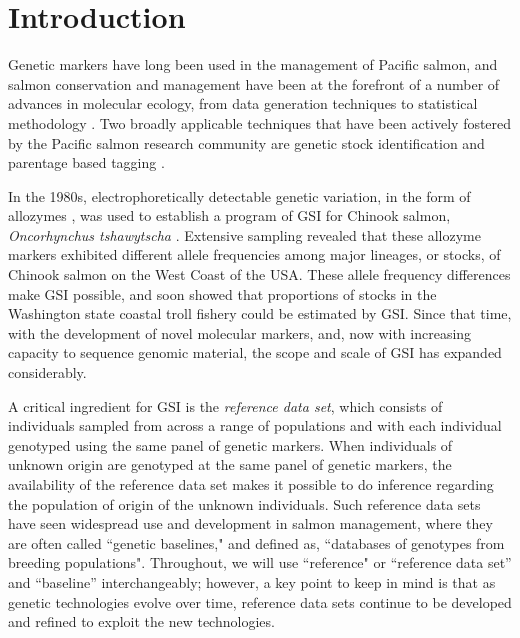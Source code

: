
\section*{Introduction}

Genetic markers have long been used in the
management of Pacific salmon, and salmon conservation and management have been
at the forefront of a number of advances in molecular ecology,
from data generation techniques \citep{clemento2011discovery,campbell2015genotyping,mckinney2017managing,baetscher2018microhaplotypes}
to statistical methodology
\citep{smouse1990genetic,anderson2002model,pella2006gibbs,anderson2010assessing}.
Two broadly applicable techniques that have been
actively fostered by the Pacific salmon research community are genetic
stock identification
\citep[GSI:~][]{milner1982genetic,beacham2004dna,seeb2007development}
and parentage based tagging
\citep[PBT:~][]{anderson2006power, garza2007large, abadia2013large, steele2013validation}.



 In the 1980s, electrophoretically
detectable genetic variation, in the form of allozymes
\citep{ayala1972allozymes,allendorf1981use}, was used to
establish a program of GSI for Chinook salmon,
{\em Oncorhynchus tshawytscha} \citep{milner1982genetic}.  Extensive sampling
revealed that these allozyme markers
exhibited different allele frequencies among major lineages, or stocks, of Chinook salmon on the West Coast of the USA.
These allele frequency differences make GSI possible, and
\citet{milner1985genetic} soon showed that proportions of stocks in
the Washington state coastal troll fishery could be estimated by GSI\@.
Since that time, with the development of novel molecular markers, and, now
with increasing capacity to sequence genomic material, the scope and scale of GSI
has expanded considerably.

A critical ingredient for GSI is the {\em reference data set}, which consists of individuals
sampled from across a range of populations and with each individual genotyped using the same
panel of genetic markers.  When individuals of unknown origin are genotyped
at the same panel of genetic markers, the availability of the reference data set
makes it possible to do inference regarding the population of origin of the
unknown individuals.  Such reference data sets have seen widespread use and
development in salmon management, where they are often called
``genetic baselines," and defined as, ``databases of genotypes from
breeding populations"\citep{seeb2007development}.  Throughout, we will
use ``reference" or ``reference data set'' and ``baseline'' interchangeably; however,
a key point to keep in mind is that as genetic technologies
evolve over time, reference data sets continue to be developed and
refined to exploit the new technologies.  


